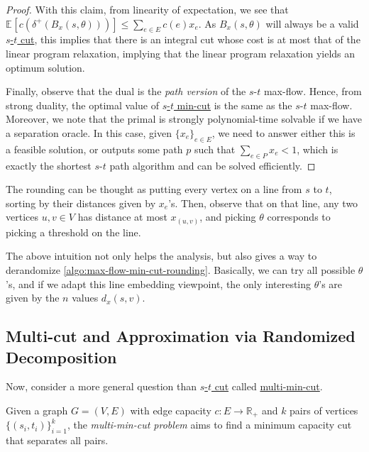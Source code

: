 \begin{proof}
	With this claim, from linearity of expectation, we see that \(\mathbb{E}_{}[c(\delta ^+(B_x(s, \theta )))] \leq \sum_{e \in E} c(e) x_e\). As \(B_x(s, \theta )\) will always be a valid \hyperref[prb:s-t-min-cut]{\(s\)-\(t\) cut}, this implies that there is an integral cut whose cost is at most that of the linear program relaxation, implying that the linear program relaxation yields an optimum solution.

	Finally, observe that the dual is the \emph{path version} of the \(s\)-\(t\) max-flow. Hence, from strong duality, the optimal value of \hyperref[prb:s-t-min-cut]{\(s\)-\(t\) min-cut} is the same as the \(s\)-\(t\) max-flow. Moreover, we note that the primal is strongly polynomial-time solvable if we have a separation oracle. In this case, given \(\{ x_e \} _{e\in E}\), we need to answer either this is a feasible solution, or outputs some path \(p\) such that \(\sum_{e \in P} x_e < 1\), which is exactly the shortest \(s\)-\(t\) path algorithm and can be solved efficiently.
\end{proof}

\begin{intuition}
	The rounding can be thought as putting every vertex on a line from \(s\) to \(t\), sorting by their distances given by \(x_e\)'s. Then, observe that on that line, any two vertices \(u, v \in V\) has distance at most \(x_{(u, v)}\), and picking \(\theta \) corresponds to picking a threshold on the line.
\end{intuition}

The above intuition not only helps the analysis, but also gives a way to derandomize \autoref{algo:max-flow-min-cut-rounding}. Basically, we can try all possible \(\theta \)'s, and if we adapt this line embedding viewpoint, the only interesting \(\theta \)'s are given by the \(n\) values \(d_x(s, v)\).

\subsection{Multi-cut and Approximation via Randomized Decomposition}
Now, consider a more general question than \hyperref[prb:s-t-min-cut]{\(s\)-\(t\) cut} called \hyperref[prb:multi-min-cut]{multi-min-cut}.

\begin{problem}\label{prb:multi-min-cut}
Given a graph \(G = (V, E)\) with edge capacity \(c \colon E \to \mathbb{R} _+\) and \(k\) pairs of vertices \(\{ (s_i, t_i) \} _{i=1}^{k}\), the \emph{multi-min-cut problem} aims to find a minimum capacity cut that separates all pairs.
\end{problem}

